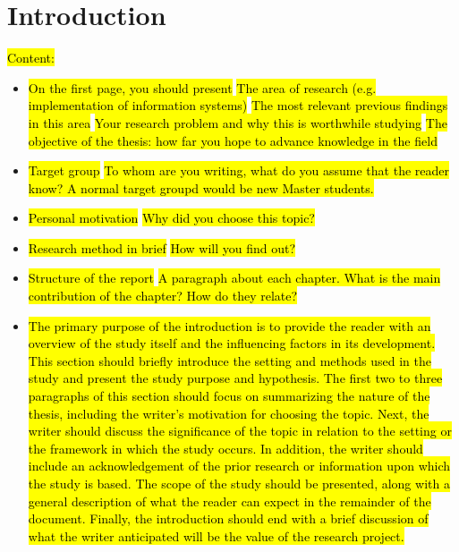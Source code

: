 \newpage
\chapter{Introduction}
\iffalse
    \hl{Content:}
    \begin{itemize}
        \item \hl{On the first page, you should present}
            \subitem \hl{The area of research (e.g. implementation of information systems)}
            \subitem \hl{The most relevant previous findings in this area}
            \subitem \hl{Your research problem and why this is worthwhile studying}
            \subitem \hl{The objective of the thesis: how far you hope to advance knowledge in the field}
        \item \hl{Target group}
            \subitem \hl{To whom are you writing, what do you assume that the reader know? A normal target groupd would be new Master students.}
        \item \hl{Personal motivation}
            \subitem \hl{Why did you choose this topic?}
        \item \hl{Research method in brief}
            \subitem \hl{How will you find out?}
        \item \hl{Structure of the report}
            \subitem \hl{A paragraph about each chapter. What is the main contribution of the chapter? How do they relate?}
    \end{itemize}
    
    \begin{itemize}
        \item \hl{The primary purpose of the introduction is to provide the reader with an overview of the study itself and the influencing factors in its development. This section should briefly introduce the setting and methods used in the study and present the study purpose and hypothesis. The first two to three paragraphs of this section should focus on summarizing the nature of the thesis, including the writer's motivation for choosing the topic. Next, the writer should discuss the significance of the topic in relation to the setting or the framework in which the study occurs. In addition, the writer should include an acknowledgement of the prior research or information upon which the study is based. The scope of the study should be presented, along with a general description of what the reader can expect in the remainder of the document. Finally, the introduction should end with a brief discussion of what the writer anticipated will be the value of the research project. }
    \end{itemize}
    
